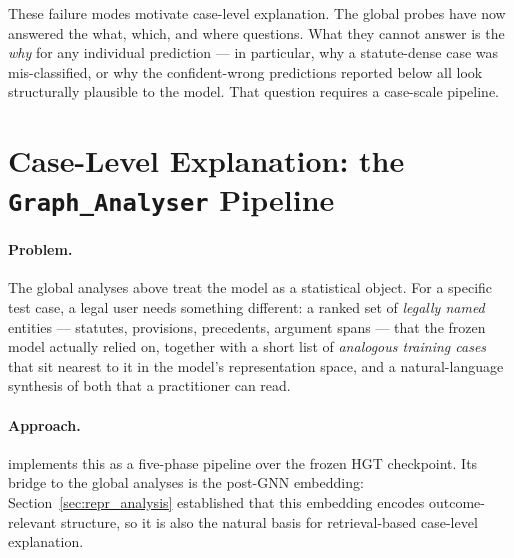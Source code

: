 These failure modes motivate case-level explanation.  The global
probes have now answered the what, which, and where questions.  What
they cannot answer is the \emph{why} for any individual prediction
--- in particular, why a statute-dense case was mis-classified, or
why the confident-wrong predictions reported below all look
structurally plausible to the model.  That question requires a
case-scale pipeline.

\section{Case-Level Explanation: the \texttt{Graph\_Analyser} Pipeline}
\label{sec:case_pipeline}

\paragraph{Problem.}
The global analyses above treat the model as a statistical object.
For a specific test case, a legal user needs something different: a
ranked set of \emph{legally named} entities --- statutes, provisions,
precedents, argument spans --- that the frozen model actually relied
on, together with a short list of \emph{analogous training cases}
that sit nearest to it in the model's representation space, and a
natural-language synthesis of both that a practitioner can read.

\paragraph{Approach.}
 implements this as a five-phase pipeline over
the frozen HGT checkpoint.  Its bridge to the global analyses is the
post-GNN embedding: Section~\ref{sec:repr_analysis} established that
this embedding encodes outcome-relevant structure, so it is also the
natural basis for retrieval-based case-level explanation.

